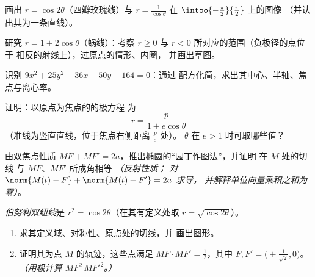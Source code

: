 \begin{exercise}[$\star$]\label{exo:b1:curves:4}
画出 $r = \cos 2\theta$（四瓣玫瑰线）与
$r = \frac{1}{\cos\theta}$ 在 $\intoo{-\frac\pi2}{\frac\pi2}$ 上的图像
（并认出其为一条直线）。
\end{exercise}

\begin{exercise}[$\star\star$]\label{exo:b1:curves:5}
研究 $r = 1 + 2\cos\theta$（蜗线）：考察
$r \geq 0$ 与 $r < 0$ 所对应的范围（负极径的点位于
相反的射线上），过原点的情形、内圈，
并画出草图。
\end{exercise}

\begin{exercise}[$\star\star$]\label{exo:b1:curves:6}
识别 $9x^2 + 25y^2 - 36x - 50y - 164 = 0$：通过
配方化简，求出其中心、半轴、焦点与离心率。
\end{exercise}

\begin{exercise}[$\star\star$]\label{exo:b1:curves:7}
证明：以原点为焦点的的极方程
为
\[
r = \frac{p}{1 + e\cos\theta}
\]
（准线为竖直直线，位于焦点右侧距离 $\frac pe$ 处）。
$\theta$ 在 $e > 1$ 时可取哪些值？
\end{exercise}

\begin{exercise}[$\star\star$]\label{exo:b1:curves:8}
由双焦点性质 $MF + MF' = 2a$，推出椭圆的“园丁作图法”，并证明
在 $M$ 处的切线
与 $MF$、$MF'$ 所成角相等 \emph{（反射性质；
对 $\norm{M(t) - F} + \norm{M(t) - F'} = 2a$ 求导，
并解释单位向量乘积之和为零）}。
\end{exercise}

\begin{exercise}[$\star\star\star$]\label{exo:b1:curves:9}
\emph{伯努利双纽线}是 $r^2 = \cos
2\theta$（在其有定义处取 $r = \sqrt{\cos2\theta}$）。
\begin{enumerate}
  \item 求其定义域、对称性、原点处的切线，并
        画出图形。
  \item 证明其为点 $M$ 的轨迹，这些点满足 $MF \cdot MF'
        = \frac12$，其中 $F, F' = \bigl(\pm\frac{1}{\sqrt2},
        0\bigr)$。\emph{（用极计算
        $MF^2\,MF'^2$。）}
\end{enumerate}
\end{exercise}

